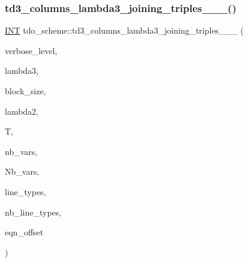 \subsubsection{\texorpdfstring{td3\+\_\+columns\+\_\+lambda3\+\_\+joining\+\_\+triples\+\_\+\_\+\_()}{td3\_columns\_lambda3\_joining\_triples\_1\_1\_1()}}
{\footnotesize\ttfamily \mbox{\hyperlink{galois_8h_a09fddde158a3a20bd2dcadb609de11dc}{I\+NT}} tdo\+\_\+scheme\+::td3\+\_\+columns\+\_\+lambda3\+\_\+joining\+\_\+triples\+\_\+\_\+\_ (\begin{DoxyParamCaption}\item[{\mbox{\hyperlink{galois_8h_a09fddde158a3a20bd2dcadb609de11dc}{I\+NT}}}]{verbose\+\_\+level,  }\item[{\mbox{\hyperlink{galois_8h_a09fddde158a3a20bd2dcadb609de11dc}{I\+NT}}}]{lambda3,  }\item[{\mbox{\hyperlink{galois_8h_a09fddde158a3a20bd2dcadb609de11dc}{I\+NT}}}]{block\+\_\+size,  }\item[{\mbox{\hyperlink{galois_8h_a09fddde158a3a20bd2dcadb609de11dc}{I\+NT}}}]{lambda2,  }\item[{\mbox{\hyperlink{classtdo__data}{tdo\+\_\+data}} \&}]{T,  }\item[{\mbox{\hyperlink{galois_8h_a09fddde158a3a20bd2dcadb609de11dc}{I\+NT}}}]{nb\+\_\+vars,  }\item[{\mbox{\hyperlink{galois_8h_a09fddde158a3a20bd2dcadb609de11dc}{I\+NT}}}]{Nb\+\_\+vars,  }\item[{\mbox{\hyperlink{galois_8h_a09fddde158a3a20bd2dcadb609de11dc}{I\+NT}} $\ast$\&}]{line\+\_\+types,  }\item[{\mbox{\hyperlink{galois_8h_a09fddde158a3a20bd2dcadb609de11dc}{I\+NT}} \&}]{nb\+\_\+line\+\_\+types,  }\item[{\mbox{\hyperlink{galois_8h_a09fddde158a3a20bd2dcadb609de11dc}{I\+NT}}}]{eqn\+\_\+offset }\end{DoxyParamCaption})}

\mbox{\label{classtdo__scheme_aa2cd70ed8bafa3c5a69d5395bdede8d1}} 
